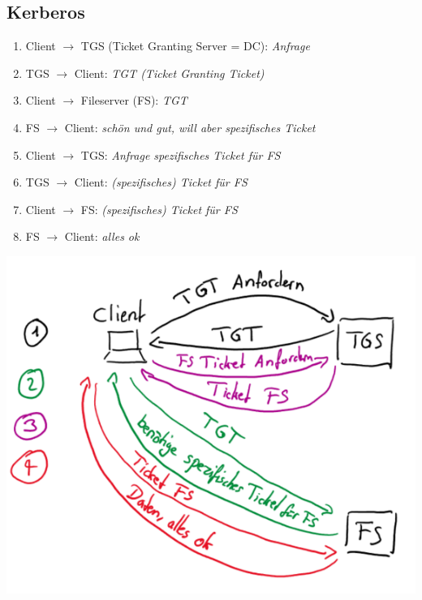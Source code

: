 \newpage

\subsection{Kerberos}
\begin{enumerate}
    \item Client $\rightarrow$ TGS (Ticket Granting Server = DC): \textit{Anfrage}
    \item TGS $\rightarrow$ Client: \textit{TGT (Ticket Granting Ticket)}
    \item Client $\rightarrow$ Fileserver (FS): \textit{TGT}
    \item FS $\rightarrow$ Client: \textit{schön und gut, will aber spezifisches Ticket}
    \item Client $\rightarrow$ TGS: \textit{Anfrage spezifisches Ticket für FS}
    \item TGS $\rightarrow$ Client: \textit{(spezifisches) Ticket für FS}
    \item Client $\rightarrow$ FS: \textit{(spezifisches) Ticket für FS}
    \item FS $\rightarrow$ Client: \textit{alles ok}
\end{enumerate}
\begin{center}
    \includegraphics[width=0.9\linewidth]{./img/03-active_directory/kerberos}
    \vspace{-8pt}
\end{center}

